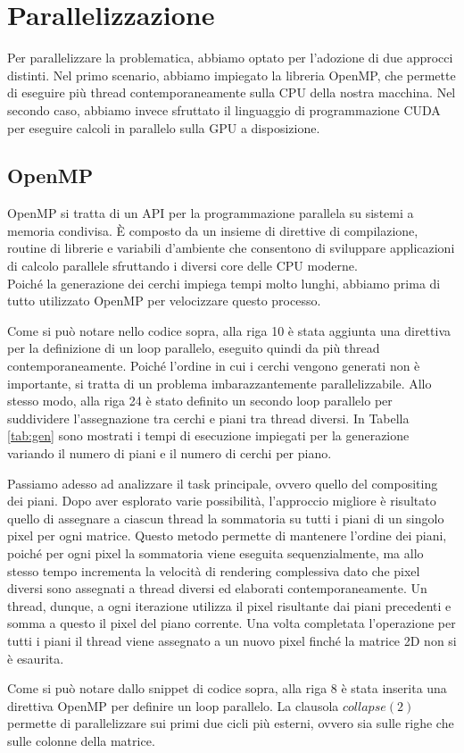 \documentclass[11pt]{article}
\begin{document}
    \section{Parallelizzazione}
    Per parallelizzare la problematica, abbiamo optato per l'adozione di due approcci distinti.
    Nel primo scenario, abbiamo impiegato la libreria OpenMP, che permette di eseguire più thread contemporaneamente sulla CPU della nostra macchina.
    Nel secondo caso, abbiamo invece sfruttato il linguaggio di programmazione CUDA per eseguire calcoli in parallelo sulla GPU a disposizione.

    \subsection{OpenMP}\label{subsec:openmp}
    OpenMP si tratta di un API per la programmazione parallela su sistemi a memoria condivisa.
    È composto da un insieme di direttive di compilazione, routine di librerie e variabili d'ambiente che consentono di sviluppare applicazioni di calcolo parallele sfruttando i diversi core delle CPU moderne.\\
    Poiché la generazione dei cerchi impiega tempi molto lunghi, abbiamo prima di tutto utilizzato OpenMP per velocizzare questo processo.
    
    Come si può notare nello codice sopra, alla riga 10 è stata aggiunta una direttiva per la definizione di un loop parallelo, eseguito quindi da più thread contemporaneamente. Poiché l'ordine in cui i cerchi vengono generati non è importante, si tratta di un problema imbarazzantemente parallelizzabile.
    Allo stesso modo, alla riga 24 è stato definito un secondo loop parallelo per suddividere l'assegnazione tra cerchi e piani tra thread diversi. In Tabella \ref{tab:gen} sono mostrati i tempi di esecuzione impiegati per la generazione variando il numero di piani e il numero di cerchi per piano.

    Passiamo adesso ad analizzare il task principale, ovvero quello del compositing dei piani.
    Dopo aver esplorato varie possibilità, l'approccio migliore è risultato quello di assegnare a ciascun thread la sommatoria su tutti i piani di un singolo pixel per ogni matrice.
    Questo metodo permette di mantenere l'ordine dei piani, poiché per ogni pixel la sommatoria viene eseguita sequenzialmente, ma allo stesso tempo incrementa la velocità di rendering complessiva dato che pixel diversi sono assegnati a thread diversi ed elaborati contemporaneamente.
    Un thread, dunque, a ogni iterazione utilizza il pixel risultante dai piani precedenti e somma a questo il pixel del piano corrente. Una volta completata l'operazione per tutti i piani il thread viene assegnato a un nuovo pixel finché la matrice 2D non si è esaurita.
    
    Come si può notare dallo snippet di codice sopra, alla riga 8 è stata inserita una direttiva OpenMP per definire un loop parallelo. La clausola $collapse(2)$ permette di parallelizzare sui primi due cicli più esterni, ovvero sia sulle righe che sulle colonne della matrice.\\
\end{document}
